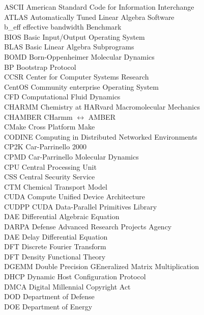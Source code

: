 \begin{tabbing}
ASCII   \> American Standard Code for Information Interchange\\
ATLAS   \> Automatically Tuned Linear Algebra Software\\
b\_eff  \> effective bandwidth Benchmark\\
BIOS    \> Basic Input/Output Operating System\\
BLAS    \> Basic Linear Algebra Subprograms\\
BOMD    \> Born-Oppenheimer Molecular Dynamics\\
BP      \> Bootstrap Protocol\\
CCSR    \> Center for Computer Systems Research\\
CentOS  \> Community enterprise Operating System\\
CFD     \> Computational Fluid Dynamics\\
CHARMM  \> Chemistry at HARvard Macromolecular Mechanics\\
CHAMBER \> CHarmm $\leftrightarrow$ AMBER\\
CMake   \> Cross Platform Make\\
CODINE  \> Computing in Distributed Networked Environments\\
CP2K    \> Car-Parrinello 2000\\
CPMD    \> Car-Parrinello Molecular Dynamics\\
CPU     \> Central Processing Unit\\
CSS     \> Central Security Service\\
CTM     \> Chemical Transport Model\\
CUDA    \> Compute Unified Device Architecture\\
CUDPP   \> CUDA Data-Parallel Primitives Library\\
DAE     \> Differential Algebraic Equation\\
DARPA   \> Defense Advanced Research Projects Agency\\
DAE     \> Delay Differential Equation\\
DFT     \> Discrete Fourier Transform\\
DFT     \> Density Functional Theory\\
DGEMM   \> Double Precision GEneralized Matrix Multiplication\\
DHCP    \> Dynamic Host Configuration Protocol\\
DMCA    \> Digital Millennial Copyright Act\\
DOD     \> Department of Defense\\
DOE     \> Department of Energy\\

\end{tabbing}
